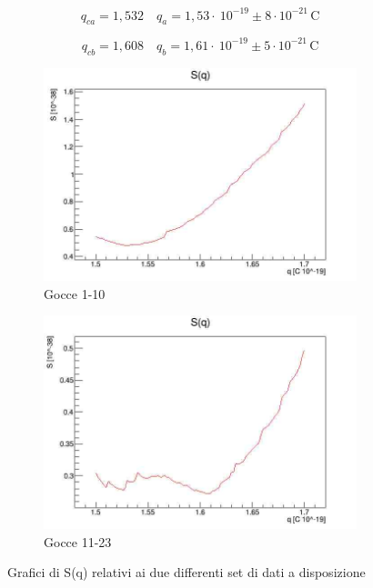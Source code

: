 \documentclass{article}
\begin{document}
\[q_{ca}=1,532 \quad q_a = 1,53 \cdot\ 10^{-19} \pm 8 \cdot 10^{-21} \, \textrm{C}\]

\[q_{cb}=1,608 \quad q_b = 1,61 \cdot\ 10^{-19} \pm 5 \cdot 10^{-21} \, \textrm{C}\]

\begin{figure}[h]
  \centering
  \begin{subfigure}[b]{0.4\linewidth}
    \includegraphics[width=\linewidth]{SA_q}
    \caption{Gocce 1-10}
  \end{subfigure}
  \begin{subfigure}[b]{0.4\linewidth}
    \includegraphics[width=\linewidth]{SB_q}
    \caption{Gocce 11-23}
  \end{subfigure}
\caption{Grafici di S(q) relativi ai due differenti set di dati a disposizione}
\label{rianalisi}
\end{figure}
\end{document}

